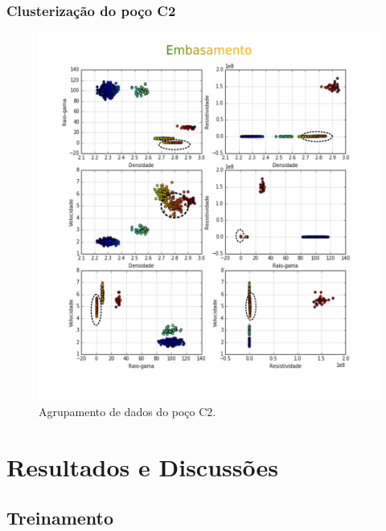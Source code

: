 \documentclass[10pt]{beamer} %
\begin{document}
\begin{frame}
	\frametitle{Clusterização do poço C2}
	\begin{figure}[H]
		\centering
		\includegraphics[scale=0.4]{Imagens/embasamentoC2.png}
		\caption{Agrupamento de dados do poço C2.}
	\end{figure} 
\end{frame}







\section{Resultados e Discussões}

\subsection{Treinamento}
\end{document}
